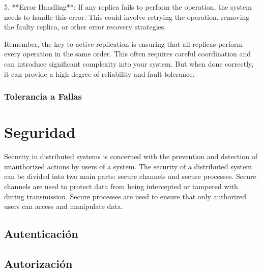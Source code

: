 \documentclass[10pt]{article} %
\begin{document}
	5. **Error Handling**: If any replica fails to perform the operation, the system needs to handle this error. This could involve retrying the operation, removing the faulty replica, or other error recovery strategies.
	
	Remember, the key to active replication is ensuring that all replicas perform every operation in the same order. This often requires careful coordination and can introduce significant complexity into your system. But when done correctly, it can provide a high degree of reliability and fault tolerance.
	
	\subsubsection{Tolerancia a Fallas}
	
	\section{Seguridad}
	
	Security in distributed systems is concerned with the prevention and detection of unauthorized actions by users of a system. The security of a distributed system can be divided into two main parts: secure channels and secure processes. Secure channels are used to protect data from being intercepted or tampered with during transmission. Secure processes are used to ensure that only authorized users can access and manipulate data.
		
	\subsection{Autenticaci\'on}
	
	\subsection{Autorizaci\'on}
	
	 
\end{document}
